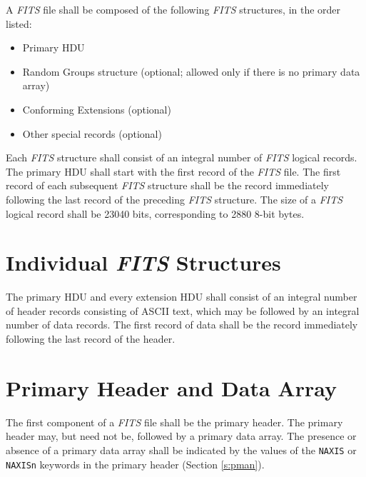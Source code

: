    A {\em FITS\/} file shall be composed of the following {\em FITS\/} 
   structures, in the 
   order
   listed:
   \begin{itemize}
   \item Primary HDU
   \item Random Groups structure (optional; allowed only if there is 
   no primary data array)
   \item Conforming Extensions
   (optional)
   \item Other special records (optional)
   \end{itemize}
  
   Each {\em FITS\/} structure shall 
   consist of an integral number of {\em FITS\/} logical
   records.  The primary HDU shall start 
   with the first record of the
   {\em FITS\/} file.  The first record of each subsequent 
   {\em FITS\/} structure shall be 
   the record immediately 
   following the last record of the preceding {\em FITS\/} structure.  
   The size of a {\em FITS\/} logical record shall be 23040 bits, 
   corresponding to 2880 8-bit bytes. 
  
  \section {Individual {\em\bf FITS} Structures}
   The primary HDU and every extension 
   HDU shall consist of an
   integral number of header records consisting of ASCII 
   text, which may be followed by an integral number of data records.  
   The first record of data shall be the record immediately following 
   the last record of the header.
  
  \section{Primary Header and Data Array}
   The first component of a {\em FITS\/} file shall be the 
   primary
   header.  The primary header may, but need not be, followed by
   a primary data
   array. The presence or absence of a primary data 
   array shall be indicated by the values of the {\tt NAXIS} 
   or {\tt NAXISn} keywords
   in the primary header (Section \ref{s:pman}).
  
